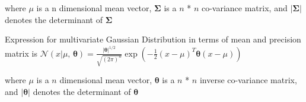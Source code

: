 \documentclass[a4paper,11pt]{article}
\theoremstyle{mytheor}
\begin{document}
where $\mu$ is a n dimensional mean vector, $\boldsymbol\Sigma$ is a $n$ * $n$ co-variance matrix, and  $|\boldsymbol\Sigma|$ denotes the determinant of $\boldsymbol\Sigma$ \newline\newline

Expression for multivariate Gaussian Distribution in terms of mean and precision matrix is \newline\newline
$\mathcal{N}(x|\mu,\,\boldsymbol\theta) = \frac{|\boldsymbol\theta|^{1/2}}{\sqrt{(2\pi)^n}}
\exp\left(-\frac{1}{2}({x}-{\mu})^T{\boldsymbol\theta}({x}-{\mu})
\right)$

where $\mu$ is a $n$ dimensional mean vector, $\boldsymbol\theta$ is a $n$ * $n$ inverse co-variance matrix, and  $|\boldsymbol\theta|$ denotes the determinant of $\boldsymbol\theta$
\end{document}
